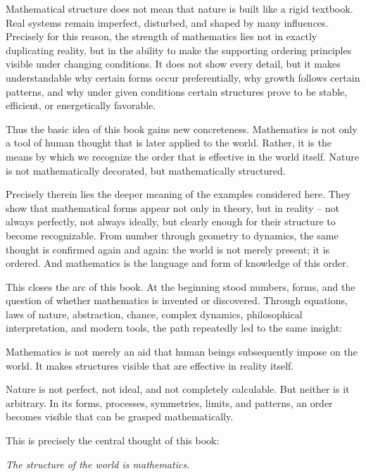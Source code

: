 Mathematical structure does not mean
that nature is built like a rigid textbook.
Real systems remain imperfect,
disturbed,
and shaped by many influences.
Precisely for this reason, the strength of mathematics lies not in exactly duplicating reality,
but in the ability
to make the supporting ordering principles visible
under changing conditions.
It does not show every detail,
but it makes understandable
why certain forms occur preferentially,
why growth follows certain patterns,
and why under given conditions certain structures
prove to be stable,
efficient,
or energetically favorable.

Thus the basic idea of this book gains new concreteness.
Mathematics is not only a tool of human thought
that is later applied to the world.
Rather, it is the means
by which we recognize the order
that is effective in the world itself.
Nature is not mathematically decorated,
but mathematically structured.

Precisely therein lies the deeper meaning of the examples considered here.
They show
that mathematical forms appear not only in theory,
but in reality --
not always perfectly,
not always ideally,
but clearly enough
for their structure to become recognizable.
From number through geometry to dynamics,
the same thought is confirmed again and again:
the world is not merely present;
it is ordered.
And mathematics is the language and form of knowledge of this order.

\medskip

This closes the arc of this book.
At the beginning stood numbers,
forms,
and the question
of whether mathematics is invented or discovered.
Through equations,
laws of nature,
abstraction,
chance,
complex dynamics,
philosophical interpretation,
and modern tools,
the path repeatedly led to the same insight:

Mathematics is not merely an aid
that human beings subsequently impose on the world.
It makes structures visible
that are effective in reality itself.

Nature is not perfect,
not ideal,
and not completely calculable.
But neither is it arbitrary.
In its forms,
processes,
symmetries,
limits,
and patterns,
an order becomes visible
that can be grasped mathematically.

This is precisely the central thought of this book:

\medskip

\begin{center}
	\emph{The structure of the world is mathematics.}
\end{center}